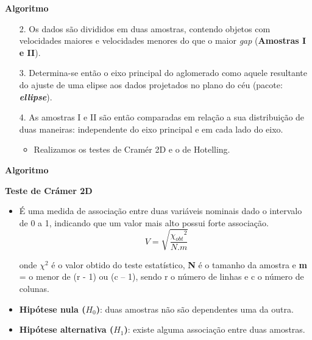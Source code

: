 \documentclass[xcolor=dvipsnames,10pt]{beamer}
\begin{document}
\begin{frame}{\textbf{Algoritmo}}
  \begin{enumerate}
    \item[2.] Os dados são divididos em duas amostras, contendo objetos com velocidades maiores e velocidades menores do que o maior \textit{gap} (\textbf{Amostras I e II}).
    \item[3.] Determina-se então o eixo principal do aglomerado como aquele resultante do ajuste de uma elipse aos dados projetados no plano do céu (pacote: \textbf{\textit{ellipse}}).
    \item[4.] As amostras I e II são então comparadas em relação a sua distribuição de duas maneiras: independente do eixo principal e em cada lado do eixo.
    \begin{itemize}
      \item Realizamos os testes de Cramér 2D e o de Hotelling.
    \end{itemize}
  \end{enumerate}
\end{frame}

\begin{frame}{\textbf{Algoritmo}}
  \begin{block}{{\textbf{Teste de Crámer 2D}}}
    \begin{itemize}
      \item É uma medida de associação entre duas variáveis nominais dado o intervalo de 0 a 1, indicando que um valor mais alto possui forte associação.
      \begin{equation}
        \ V = \sqrt{\frac{{\chi_{obt}}^2}{N.m}}
        \label{eq:eq1}
        \end{equation}
  
        onde \textbf{$\chi^2$} é o valor obtido do teste estatístico,
        \textbf{N} é o tamanho da amostra e
        \textbf{m} = o menor de (r - 1) ou (c – 1), sendo r o número de linhas e c o número de colunas.
      \item \textbf{Hipótese nula ($H_0$)}: duas amostras não são dependentes uma da outra.
      \item \textbf{Hipótese alternativa ($H_1$)}: existe alguma associação entre duas amostras.
    \end{itemize}
  \end{block}
\end{frame}
\end{document}
